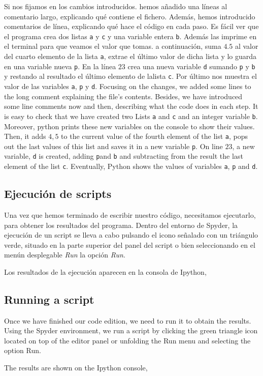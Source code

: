 \begin{paracol}{2}
Si nos fijamos en los cambios introducidos. hemos añadido una líneas al comentario largo, explicando qué contiene el fichero. Además, hemos introducido comentarios de línea, explicando qué hace el código en cada paso. Es fácil ver que el programa crea dos listas \texttt{a} y \texttt{c} y una variable entera \texttt{b}. Además las imprime en el terminal para que veamos el valor que tomas. a continuación, suma $4.5$ al valor del cuarto elemento de la lista \texttt{a}, extrae el último valor de dicha lista y lo guarda en una variable nueva \texttt{p}. En la línea $23$ crea una nueva variable \texttt{d} sumando \texttt{p} y \texttt{b} y restando al resultado el último elemento de lalista \texttt{c}. Por último nos muestra el valor de las variables \texttt{a}, \texttt{p} y \texttt{d}.
\switchcolumn
Focusing on the changes, we added some lines to the long comment explaining the file's contents. Besides, we have introduced some line comments now and then, describing what the code does in each step. It is easy to check that we have created two Lists \texttt{a} and \texttt{c} and an integer variable \texttt{b}. Moreover, python prints these new variables on the console to show their values. Then, it adds $4,5$ to the current value of the fourth element of the list \texttt{a}, pops out the last values of this list and saves it in a new variable \texttt{p}. On line $23$, a new variable, \texttt{d} is created, adding  \texttt{p}and \texttt{b} and subtracting from the result the last element of the list \texttt{c}. Eventually, Python shows the values of variables \texttt{a}, \texttt{p} and \texttt{d}.

\switchcolumn
\subsection{Ejecución de scripts}
Una vez que hemos terminado de escribir nuestro código, necesitamos ejecutarlo, para obtener los resultados del programa. Dentro del entorno de Spyder, la ejecución de un script se lleva a cabo pulsando el icono señalado con un triángulo verde, situado en la parte superior del panel del script o bien seleccionando en el menún desplegable \emph{Run} la opción \emph{Run}.

Los resultados de la ejecución aparecen en la consola de Ipython,
\switchcolumn
\subsection{Running a script}
Once we have finished our code edition, we need to run it to obtain the results. Using the Spyder environment, we run a script by clicking the green triangle icon located on top of the editor panel or unfolding the Run menu and selecting the option Run.

The results are shown on the Ipython console,
\end{paracol}


